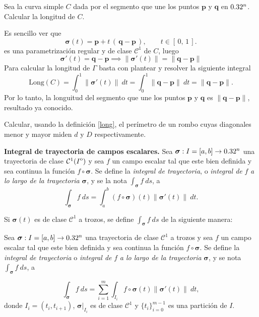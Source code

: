    
    \begin{example}
    Sea  la curva simple $C$ dada por el segmento que une los puntos $\mathbf{p}$ y $\mathbf{q}$  en \(0.32^n\).   Calcular la longitud de $C$. 
    
     Es sencillo ver que 
        \[
            \boldsymbol{\sigma}(t) 
            = 
            \mathbf{p} + t\, (\,\mathbf{q} - \mathbf{p}\,),
            \qquad t\in [\,0,\,1\,].
        \]
          es una parametrización regular y de clase  \(\mathcal{C}^1\) de \(C\), luego  
        \[
            \boldsymbol{\sigma}'(t) = \mathbf{q} - \mathbf{p}
            \implies \|\boldsymbol{\sigma}'(t)\| = \|\mathbf{q} - \mathbf{p}\|
        \]
      Para calcular la longitud de $\Gamma$  basta con plantear y resolver la siguiente integral  
        \[
            \mathrm{Long}(C)
            =
            \int_{0}^{1} \|\boldsymbol{\sigma}'(t)\|\: dt
            =
            \int_{0}^{1} \|\mathbf{q} - \mathbf{p}\|\: dt
            =
            \|\mathbf{q} - \mathbf{p}\|.
        \] Por lo tanto, la longuitud del segmento que une los puntos  $\mathbf{p}$ y $\mathbf{q}$  es $ \|\mathbf{q} - \mathbf{p}\|$, resultado ya conocido.
 \end{example}

 \begin{tarea} Calcular, usando la definici\'on  \ref{long},   el per\'imetro de un rombo cuyas diagonales menor y mayor miden $d$ y $D$ respectivamente.  
 \end{tarea}


\begin{definition}\textbf{Integral de trayectoria de campos escalares.}
    Sea $\boldsymbol{\sigma}:I=[a,b]\to0.32^n$ una trayectoria de clase $\mathcal{C}^1({\kern0ptI}^{\mathrm{o}})$ y sea $f$ un campo escalar tal que este bien definida y sea continua   la funci\'on $f\circ\boldsymbol{\sigma}$.  Se define la \emph{integral de trayectoria}, o \emph{integral de} $f$ \emph{a lo largo de la trayectoria} $\boldsymbol{\sigma}$, y se la nota $\int_{\boldsymbol{\sigma}}f\:ds$, a
    \[
        \int_{\boldsymbol{\sigma}}f\:ds=\int_a^b (f\circ\boldsymbol{\sigma})(t)  \|\boldsymbol{\sigma}'(t)\|\:dt.
    \]
\end{definition}

Si $\boldsymbol{\sigma}(t)$ es de clase $\mathcal{C}^1$ a trozos, se define $\int_{\boldsymbol{\sigma}}f\:ds$  de la siguiente manera:  
\begin{definition}   Sea $\boldsymbol{\sigma}:I=[a,b]\to0.32^n$ una trayectoria de clase $\mathcal{C}^1$ a trozos   y  sea $f$ un campo escalar tal que este bien definida y sea continua   la funci\'on $f\circ\boldsymbol{\sigma}$.  Se define la \emph{integral de trayectoria}  o \emph{integral de} $f$ \emph{a lo largo de la trayectoria} $\boldsymbol{\sigma}$, y se  nota $\int_{\boldsymbol{\sigma}}f\:ds$, a
  
    \[
       \int_{\boldsymbol{\sigma}}f\:ds =\sum_{i=1}^{m}\int_{I_i}f\circ\boldsymbol{\sigma}(t)\|\boldsymbol{\sigma}'(t)\|\:dt,  
    \]
    donde $ I_i= (t_i, t_{i+1})$,  $\boldsymbol{\sigma}\lvert_{I_i}$ es de clase $\mathcal{C}^1$  y  $\{t_i\}_{i=0}^{m-1}$  es una partici\'on de $I$.
\end{definition}





